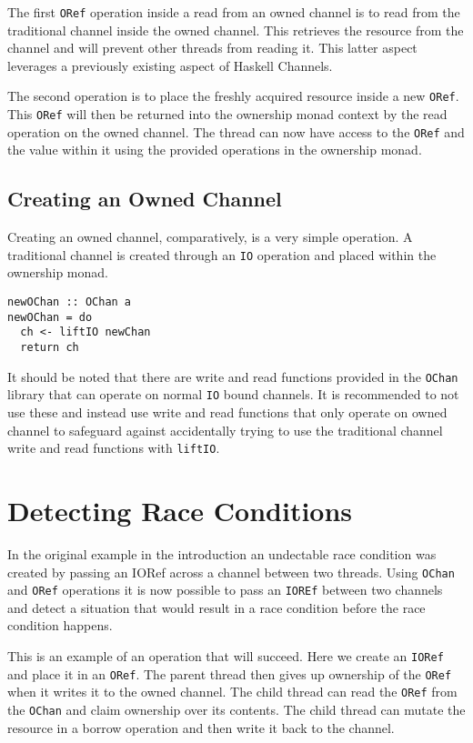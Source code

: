 \documentclass[onehalf,11pt]{beavtex}
\begin{document}
The first \texttt{ORef} operation inside a read from an owned channel
is to read from the traditional channel inside the owned channel. This
retrieves the resource from the channel and will prevent other threads from
reading it. This latter aspect leverages a previously existing aspect of
Haskell Channels. %

The second operation is to place the freshly acquired resource inside a new
\texttt{ORef}.  This \texttt{ORef} will then be returned into the
ownership monad context by the read operation on the
owned channel.  The thread can now have access to the \texttt{ORef}
and the value within it using the provided operations in the
ownership monad.


\subsection{Creating an Owned Channel}

Creating an owned channel, comparatively, is a very simple operation.
A traditional channel is created through an \texttt{IO} operation and placed
within the ownership monad.

\begin{verbatim}
newOChan :: OChan a
newOChan = do
  ch <- liftIO newChan
  return ch
\end{verbatim}

It should be noted that there are write and read functions provided
in the \texttt{OChan} library that can operate on normal \texttt{IO} bound
channels.  It is recommended to not use these and instead use write and read
functions that only operate on owned channel to safeguard against
accidentally trying to use the traditional channel write and read functions
with \texttt{liftIO}.

\section{Detecting Race Conditions}

In the original example in the introduction an undectable race condition was
created by passing an IORef across a channel between two threads.
Using \texttt{OChan} and \texttt{ORef} operations it is now possible
to pass an \texttt{IOREf} between two channels and detect a situation
that would result in a race condition before the race condition happens.

This is an example of an operation that will succeed. Here we create an
\texttt{IORef} and place it in an \texttt{ORef}. The parent thread
then gives up ownership of the \texttt{ORef} when it writes it to the
owned channel. The child thread can read the \texttt{ORef} from the
\texttt{OChan} and claim ownership over its contents. The child thread
can mutate the resource in a borrow operation and then write it back to
the channel. 
\end{document}

